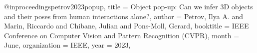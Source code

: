 @inproceedings{petrov2023popup,
    title = {Object pop-up: Can we infer 3D objects and their poses from human interactions alone?},
    author = {Petrov, Ilya A. and Marin, Riccardo and Chibane, Julian and Pons-Moll, Gerard},
    booktitle = {{IEEE} Conference on Computer Vision and Pattern Recognition (CVPR)},
    month = {June},
    organization = {{IEEE}},
    year = {2023},
}